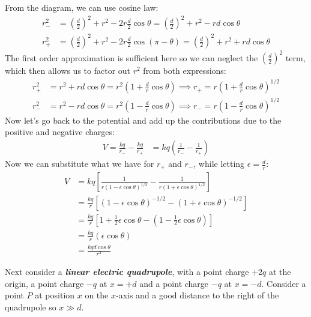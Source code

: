 \documentclass[10pt]{article}
\begin{document}
\begin{enumerate}[label=\alph*)]
\begin{solution}
				From the diagram, we can use cosine law:
				\begin{align*}
					r_-^2 &= \left( \frac{d}{2} \right)^2 + r^2 - 2r \frac{d}{2}\cos \theta = 
					\left( \frac{d}{2} \right)^2 + r^2 - r d \cos \theta \\
					r_+^2 &= \left( \frac{d}{2} \right)^2 + r^2 - 2r \frac{d}{2}\cos(\pi - \theta) =
					\left( \frac{d}{2} \right)^2 + r^2 + r d \cos \theta 
				\end{align*}		
				The first order approximation is sufficient here so we can neglect the $(\frac{d}{2})^2$ term, 
				which then allows us to factor out $r^2$ from both expressions:
				\begin{align*}
					r_+^2 &= r^2 + r d \cos \theta  = r^2\left(1 + \frac{d}{r}\cos \theta\right) \implies 
					r_+ = r\left( 1 + \frac{d}{r}\cos \theta \right)^{1/2} \\
					r_-^2 &= r^2 - r d \cos \theta = r^2\left( 1 - \frac{d}{r}\cos \theta \right) \implies
					r_- = r\left( 1 - \frac{d}{r}\cos \theta \right)^{1/2}
				\end{align*}
				Now let's go back to the potential and add up the contributions due to the positive and negative
				charges:
				\begin{align*}
					V = \frac{kq}{r_-} - \frac{kq}{r_+} &= kq\left( \frac{1}{r_-} - \frac{1}{r_+} \right) 
				\end{align*}
				Now we can substitute what we have for $r_+$ and $r_-$, while letting $\epsilon = \frac{d}{r}$:
				\begin{align*}
					V &= kq\left[\frac{1}{r(1 - \epsilon \cos \theta)^{1 / 2}} - \frac{1}{r(1 + \epsilon 
					\cos \theta)^{1/2}}\right] \\
					  &= \frac{kq}{r}\left[(1 - \epsilon \cos \theta)^{- 1 / 2} - (1 + \epsilon \cos \theta)^{-
					  1/2}\right]\\
					  &= \frac{kq}{r}\left[1 + \frac{1}{2}\epsilon \cos \theta - (1 - \frac{1}{2}\epsilon \cos
					  \theta)\right]\\
					  &= \frac{kq}{r}(\epsilon \cos \theta) \\
					  &= \frac{kqd \cos \theta}{r^2}
				\end{align*}
			\end{solution}
	\end{enumerate}

	Next consider a \textbf{\textit{linear electric quadrupole}}, with a point charge $+2q$ at the origin, 
	a point charge $-q$ at $x = +d$ and a point charge $-q$ at $x = -d$. Consider a point $P$ at position $x$
	on the $x$-axis and a good distance to the right of the quadrupole so $x \gg d$. 
\end{document}
